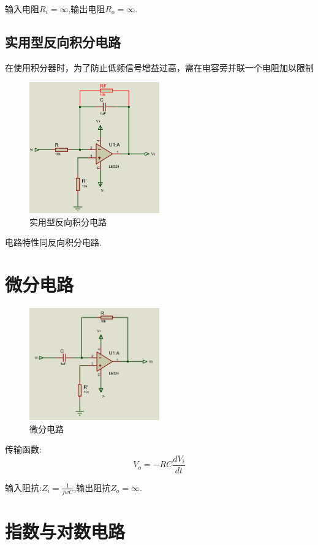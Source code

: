 \documentclass[a4paper,11pt,UTF8]{article}
\begin{document}
输入电阻$R_i=\infty$,输出电阻$R_o=\infty$.

\subsection{实用型反向积分电路}
在使用积分器时，为了防止低频信号增益过高，需在电容旁并联一个电阻加以限制


\begin{figure}[H]
	\centering
	\includegraphics[width=0.5\textwidth]{实用型反向积分电路}
	\caption{实用型反向积分电路}
\end{figure}
电路特性同反向积分电路.

\section{微分电路}
\begin{figure}[H]
	\centering
	\includegraphics[width=0.5\textwidth]{微分电路}
	\caption{微分电路}
\end{figure}
传输函数:
$$V_o = -RC\frac{dV_i}{dt}$$

输入阻抗:$Z_i=\frac{1}{jwC}$,输出阻抗$Z_o=\infty$.
\section{指数与对数电路}
\end{document}
